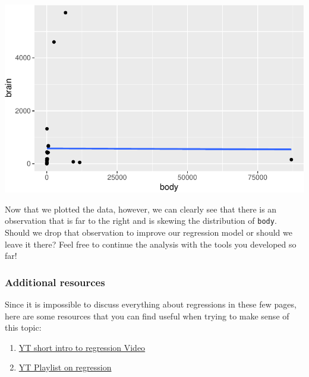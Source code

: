 \documentclass[
  letterpaper,
  DIV=11,
  numbers=noendperiod]{scrartcl}
\providecommand{\tightlist}{%
  \setlength{\itemsep}{0pt}\setlength{\parskip}{0pt}}\usepackage{longtable,booktabs,array}
\begin{document}
\includegraphics{stats_review_files/figure-pdf/unnamed-chunk-26-1.pdf}

Now that we plotted the data, however, we can clearly see that there is
an observation that is far to the right and is skewing the distribution
of \texttt{body}. Should we drop that observation to improve our
regression model or should we leave it there? Feel free to continue the
analysis with the tools you developed so far!

\subsubsection{Additional resources}\label{additional-resources-1}

Since it is impossible to discuss everything about regressions in these
few pages, here are some resources that you can find useful when trying
to make sense of this topic:

\begin{enumerate}
\def\labelenumi{\arabic{enumi}.}
\tightlist
\item
  \href{https://youtu.be/14mkCpJ7tKs?si=gF17WGfWBTTOf38z}{YT short intro
  to regression Video}
\item
  \href{https://youtube.com/playlist?list=PLblh5JKOoLUIzaEkCLIUxQFjPIlapw8nU&si=ldwNn7dwyE6ts7Q-}{YT
  Playlist on regression}
\end{enumerate}
\end{document}

